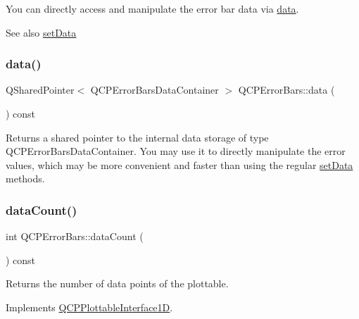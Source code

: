 You can directly access and manipulate the error bar data via \hyperlink{classQCPErrorBars_aeebd1b14f4c3573565efafd514988813}{data}.

\begin{DoxySeeAlso}{See also}
\hyperlink{classQCPErrorBars_a92b1980003255f5f7c05407a4d92aabc}{set\+Data} 
\end{DoxySeeAlso}
\mbox{\label{classQCPErrorBars_aeebd1b14f4c3573565efafd514988813}} 
\subsubsection{\texorpdfstring{data()}{data()}}
{\footnotesize\ttfamily Q\+Shared\+Pointer$<$ Q\+C\+P\+Error\+Bars\+Data\+Container $>$ Q\+C\+P\+Error\+Bars\+::data (\begin{DoxyParamCaption}{ }\end{DoxyParamCaption}) const\hspace{0.3cm}{\ttfamily [inline]}}

Returns a shared pointer to the internal data storage of type Q\+C\+P\+Error\+Bars\+Data\+Container. You may use it to directly manipulate the error values, which may be more convenient and faster than using the regular \hyperlink{classQCPErrorBars_a92b1980003255f5f7c05407a4d92aabc}{set\+Data} methods. \mbox{\label{classQCPErrorBars_a18b797c62f2af000b926e52eb46d97c7}} 
\subsubsection{\texorpdfstring{data\+Count()}{dataCount()}}
{\footnotesize\ttfamily int Q\+C\+P\+Error\+Bars\+::data\+Count (\begin{DoxyParamCaption}{ }\end{DoxyParamCaption}) const\hspace{0.3cm}{\ttfamily [virtual]}}

Returns the number of data points of the plottable. 

Implements \hyperlink{classQCPPlottableInterface1D_a058a22c770ef4d5a0e878a7f02183da9}{Q\+C\+P\+Plottable\+Interface1D}.

